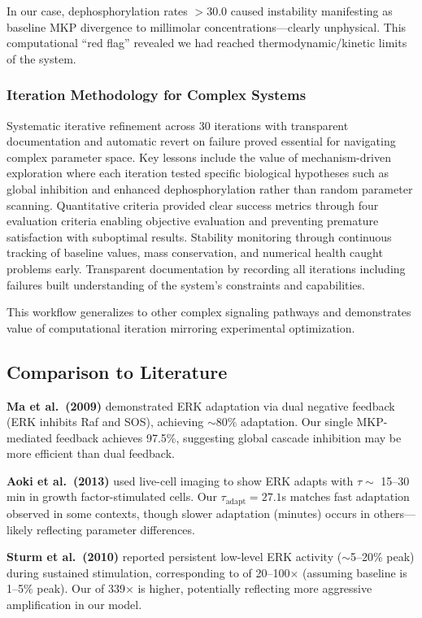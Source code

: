 \documentclass[twocolumn,11pt]{article}
\newcommand{\erk}{ERK}
\newcommand{\mkp}{MKP}
\newcommand{\srr}{\text{SRR}}
\begin{document}
In our case, dephosphorylation rates $>30.0$ caused instability manifesting as baseline MKP divergence to millimolar concentrations---clearly unphysical. This computational ``red flag'' revealed we had reached thermodynamic/kinetic limits of the system.

\subsubsection{Iteration Methodology for Complex Systems}

Systematic iterative refinement across 30 iterations with transparent documentation and automatic revert on failure proved essential for navigating complex parameter space. Key lessons include the value of mechanism-driven exploration where each iteration tested specific biological hypotheses such as global inhibition and enhanced dephosphorylation rather than random parameter scanning. Quantitative criteria provided clear success metrics through four evaluation criteria enabling objective evaluation and preventing premature satisfaction with suboptimal results. Stability monitoring through continuous tracking of baseline values, mass conservation, and numerical health caught problems early. Transparent documentation by recording all iterations including failures built understanding of the system's constraints and capabilities.

This workflow generalizes to other complex signaling pathways and demonstrates value of computational iteration mirroring experimental optimization.

\subsection{Comparison to Literature}

\textbf{Ma et al.\ (2009)} demonstrated \erk{} adaptation via dual negative feedback (ERK inhibits Raf and SOS), achieving $\sim$80\% adaptation. Our single \mkp{}-mediated feedback achieves 97.5\%, suggesting global cascade inhibition may be more efficient than dual feedback.

\textbf{Aoki et al.\ (2013)} used live-cell imaging to show \erk{} adapts with $\tau \sim$ 15--30 min in growth factor-stimulated cells. Our $\tau_{\text{adapt}} = 27.1$s matches fast adaptation observed in some contexts, though slower adaptation (minutes) occurs in others---likely reflecting parameter differences.

\textbf{Sturm et al.\ (2010)} reported persistent low-level \erk{} activity ($\sim$5--20\% peak) during sustained stimulation, corresponding to \srr{} of 20--100$\times$ (assuming baseline is 1--5\% peak). Our \srr{} of 339$\times$ is higher, potentially reflecting more aggressive amplification in our model.
\end{document}
